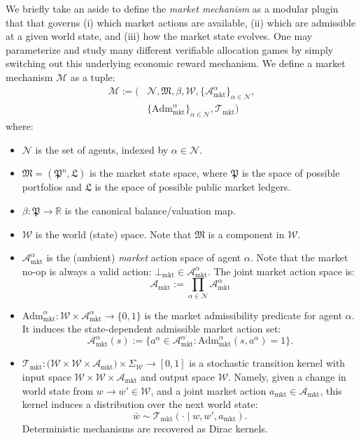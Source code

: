 \documentclass[letterpaper]{article} %
\begin{document}
We briefly take an aside to define the \emph{market mechanism} as a modular plugin that that governs (i) which market actions are available, (ii) which are admissible at a given world state, and (iii) how the market state evolves. One may parameterize and study many different verifiable allocation games by simply switching out this underlying economic reward mechanism.
\renewcommand{\epsilon}{\varepsilon}
We define a market mechanism $\mathscr{M}$ as a tuple:
\begin{align*}
\mathscr{M} :=\Big(&\mathcal{N}, \mathfrak{M},\beta, \mathcal{W},\{\mathcal{A}^\alpha_{\mathrm{mkt}}\}_{\alpha\in\mathcal{N}},
\\&\{\mathrm{Adm}^\alpha_{\mathrm{mkt}}\}_{\alpha\in\mathcal{N}},\mathcal{T}_{\mathrm{mkt}}\Big)
\end{align*}
where:
\begin{itemize}
    \item $\mathcal{N}$ is the set of agents, indexed by $\alpha\in \mathcal{N}$.
    \item $\mathfrak{M}=(\mathfrak{P}^n,\mathfrak{L})$ is the market state space, where $\mathfrak{P}$ is the space of possible portfolios and $\mathfrak{L}$ is the space of possible public market ledgers.
    \item $\beta : \mathfrak{P} \to \mathbb{R}$ is the canonical balance/valuation map.
    \item $\mathcal{W}$ is the world (state) space. Note that $\mathfrak{M}$ is a component in $\mathcal{W}$.
  
    \item $\mathcal{A}^\alpha_{\mathrm{mkt}}$ is the (ambient) \textit{market} action space of agent $\alpha$. Note that the market no-op is always a valid action: $\bot_{\mathrm{mkt}} \in \mathcal{A}_{\mathrm{mkt}}^\alpha$. The joint market action space is:
    \[
\mathcal{A}_{\mathrm{mkt}} := \prod_{\alpha\in\mathcal{N}} \mathcal{A}^\alpha_{\mathrm{mkt}}
\]
    \item $\mathrm{Adm}^\alpha_{\mathrm{mkt}}:\mathcal{W}\times\mathcal{A}^\alpha_{\mathrm{mkt}}\to\{0,1\}$ is the market admissibility predicate for agent $\alpha$. It induces the state-dependent admissible market action set:
    \[
    \mathcal{A}^\alpha_{\mathrm{mkt}}(s) := \{a^\alpha\in\mathcal{A}_{\mathrm{mkt}}^\alpha : \mathrm{Adm}_{\mathrm{mkt}}^\alpha(s,a^\alpha)=1\}.
    \]
    \item $\mathcal{T}_{\mathrm{mkt}} : \Big(\mathcal{W} \times \mathcal{W} \times \mathcal{A}_{\mathrm{mkt}}\Big) \times \Sigma_{\mathcal{W}} \to [0,1]$ is a stochastic transition kernel with input space $\mathcal{W} \times \mathcal{W} \times \mathcal{A}_{\mathrm{mkt}}$ and output space $\mathcal{W}$. Namely, given a change in world state from $w \to w' \in \mathcal{W}$, and a joint market action $a_{\mathrm{mkt}}\in\mathcal{A}_{\mathrm{mkt}}$, this kernel induces a distribution over the next world state:
\[
\bar{w}\sim \mathcal{T}_{\mathrm{mkt}}(\cdot\mid w,w',a_{\mathrm{mkt}}).
\]
Deterministic mechanisms are recovered as Dirac kernels.

    
    
    
\end{itemize}
\end{document}
